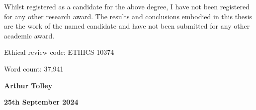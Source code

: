Whilst registered as a candidate for the above degree, I have not been registered for any other research award. The results and conclusions embodied in this thesis are the work of the named candidate and have not been submitted for any other academic award.

\vspace{\baselineskip}
\noindent Ethical review code: ETHICS-10374

\vspace{\baselineskip}
\noindent Word count: 37,941

\noindent\hrulefill

\vspace{\baselineskip}
\noindent \textbf{Arthur Tolley}

\noindent \textbf{25th September 2024}